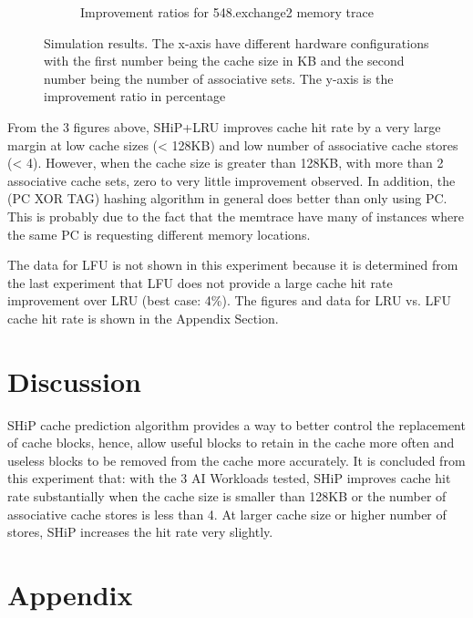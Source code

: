 \documentclass[letterpaper, 11pt]{article}
\begin{document}
\begin{figure}[htb!]
\begin{subfigure}[b]{.5\linewidth}
			\caption{Improvement ratios for 548.exchange2 memory trace}
			\label{fig3c}
		\end{subfigure}
		\caption{Simulation results. The x-axis have different hardware configurations with the first number being the cache size in KB and the second number being the number of associative sets. The y-axis is the improvement ratio in percentage}
	\end{figure}
	
	From the 3 figures above, SHiP+LRU improves cache hit rate by a very large margin at low cache sizes (< 128KB) and low number of associative cache stores (< 4). However, when the cache size is greater than 128KB, with more than 2 associative cache sets, zero to very little improvement observed. In addition, the (PC XOR TAG) hashing algorithm in general does better than only using PC. This is probably due to the fact that the memtrace have many of instances where the same PC is requesting different memory locations.  
	
	The data for LFU is not shown in this experiment because it is determined from the last experiment that LFU does not provide a large cache hit rate improvement over LRU (best case: 4\%). The figures and data for LRU vs. LFU cache hit rate is shown in the Appendix Section.

\section{Discussion}
	SHiP cache prediction algorithm provides a way to better control the replacement of cache blocks, hence, allow useful blocks to retain in the cache more often and useless blocks to be removed from the cache more accurately. It is concluded from this experiment that: with the 3 AI Workloads tested, SHiP improves cache hit rate substantially when the cache size is smaller than 128KB or the number of associative cache stores is less than 4. At larger cache size or higher number of stores, SHiP increases the hit rate very slightly.
	
\section{Appendix}
\end{document}
